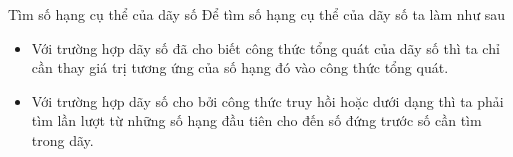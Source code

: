 
\begin{dang}{Tìm số hạng cụ thể của dãy số}
	Để tìm số hạng cụ thể của dãy số ta làm như sau
	\begin{itemize} 
		\item Với trường hợp dãy số đã cho biết công thức tổng quát của dãy số thì ta chỉ cần thay giá trị tương ứng của số hạng đó vào công thức tổng quát.
		\item  Với trường hợp dãy số cho bởi công thức truy hồi hoặc dưới dạng thì ta phải tìm lần lượt từ những số hạng đầu tiên cho đến số đứng trước số cần tìm trong dãy.
	\end{itemize}
\end{dang}
